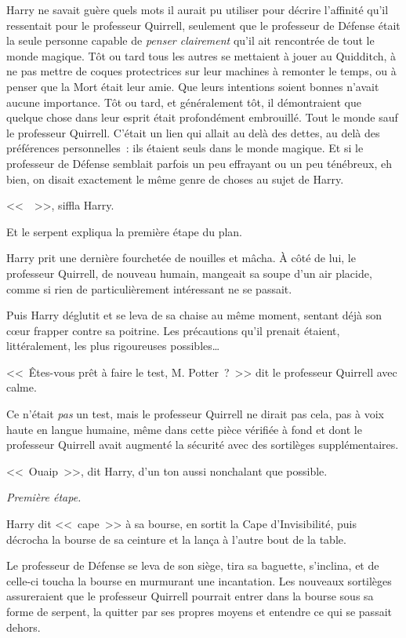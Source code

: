 Harry ne savait guère quels mots il aurait pu utiliser pour décrire l'affinité qu'il ressentait pour le professeur Quirrell, seulement que le professeur de Défense était la seule personne capable de \emph{penser clairement} qu'il ait rencontrée de tout le monde magique. Tôt ou tard tous les autres se mettaient à jouer au Quidditch, à ne pas mettre de coques protectrices sur leur machines à remonter le temps, ou à penser que la Mort était leur amie. Que leurs intentions soient bonnes n'avait aucune importance. Tôt ou tard, et généralement tôt, il démontraient que quelque chose dans leur esprit était profondément embrouillé. Tout le monde sauf le professeur Quirrell. C'était un lien qui allait au delà des dettes, au delà des préférences personnelles~: ils étaient seuls dans le monde magique. Et si le professeur de Défense semblait parfois un peu effrayant ou un peu ténébreux, eh bien, on disait exactement le même genre de choses au sujet de Harry.

<<~~>>, siffla Harry.

Et le serpent expliqua la première étape du plan.

\later

Harry prit une dernière fourchetée de nouilles et mâcha. À côté de lui, le professeur Quirrell, de nouveau humain, mangeait sa soupe d'un air placide, comme si rien de particulièrement intéressant ne se passait.

Puis Harry déglutit et se leva de sa chaise au même moment, sentant déjà son cœur frapper contre sa poitrine. Les précautions qu'il prenait étaient, littéralement, les plus rigoureuses possibles…

<<~Êtes-vous prêt à faire le test, M. Potter~?~>> dit le professeur Quirrell avec calme.

Ce n'était \emph{pas} un test, mais le professeur Quirrell ne dirait pas cela, pas à voix haute en langue humaine, même dans cette pièce vérifiée à fond et dont le professeur Quirrell avait augmenté la sécurité avec des sortilèges supplémentaires.

<<~Ouaip~>>, dit Harry, d'un ton aussi nonchalant que possible.

\emph{Première étape.}

Harry dit <<~cape~>> à sa bourse, en sortit la Cape d'Invisibilité, puis décrocha la bourse de sa ceinture et la lança à l'autre bout de la table.

Le professeur de Défense se leva de son siège, tira sa baguette, s'inclina, et de celle-ci toucha la bourse en murmurant une incantation. Les nouveaux sortilèges assureraient que le professeur Quirrell pourrait entrer dans la bourse sous sa forme de serpent, la quitter par ses propres moyens et entendre ce qui se passait dehors.

